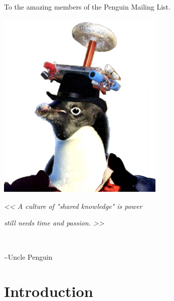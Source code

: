 \documentclass[12pt]{report}
\begin{document}
\setlength{\parskip}{0em}
\renewcommand{\baselinestretch}{0.0}

\newpage


\thispagestyle{empty}
\begin{center}
    
\vspace*{2.5cm}

{\selectfont
To the amazing members of the Penguin Mailing List.
}

\vspace*{3cm}

\includegraphics[width = 80mm]{PML.png}

\vspace*{1cm}

\small
{\selectfont
\textit{<< A culture of "shared knowledge" is power}

\textit{still needs time and passion. >>}

\,\,\,

\textasciitilde Uncle Penguin

}

\vspace*{2cm}

\end{center}

\newpage

\setlength{\parindent}{0cm}
\clearpage

\tableofcontents

\setlength{\parskip}{1em}
\renewcommand{\baselinestretch}{1.0}

\newpage

\chapter{Introduction} \label{chap:intro}
\end{document}
